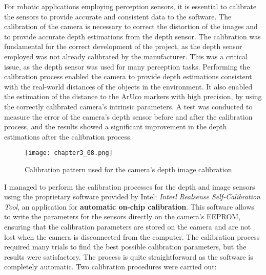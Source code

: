 For robotic applications employing perception sensors, it is essential to calibrate the sensors to provide accurate
and consistent data to the software. The calibration of the camera is necessary to correct the distortion
of the images and to provide accurate depth estimations from the depth sensor.
The calibration was fundamental for the correct development of the project, as the depth sensor employed was not
already calibrated by the manufacturer. This was a critical issue, as the depth sensor was used for many perception tasks.
Performing the calibration process enabled the camera to provide depth estimations consistent with the real-world distances
of the objects in the environment. It also enabled the estimation of the distance to the ArUco markers with high precision,
by using the correctly calibrated camera's intrinsic parameters. A test was conducted to measure the error of the camera's
depth sensor before and after the calibration process, and the results showed a significant improvement in the depth
estimations after the calibration process.


\begin{figure}[t]
    \centering
    \texttt{[image: chapter3\_08.png]}
    \captionsetup{width=1\linewidth}
    \caption{Calibration pattern used for the camera's depth image calibration}
    \label{fig:c3_img08}
\end{figure}


I managed to perform the calibration processes for the depth and image sensors using the proprietary software provided by Intel:
\textit{Interl Realsense Self-Calibration Tool}, an application for \textbf{automatic on-chip calibration}.
This software allows to write the parameters for the sensors directly on the camera's EEPROM, ensuring that the calibration
parameters are stored on the camera and are not lost when the camera is disconnected from the computer.
The calibration process required many trials to find the best possible calibration parameters, but the results were
satisfactory. The process is quite straightforward as the software is completely automatic.
Two calibration procedures were carried out:

